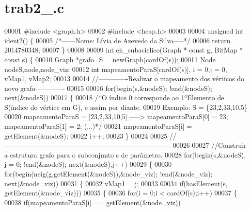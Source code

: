 \section{trab2\+\_.\+c}
\label{trab2__2014780348_8c_source}

\begin{DoxyCode}
00001 \textcolor{preprocessor}{#include <graph.h>}
00002 \textcolor{preprocessor}{#include <heap.h>}
00003 
00004 \textcolor{keywordtype}{unsigned} \textcolor{keywordtype}{int} ident2() \{
00005         \textcolor{comment}{/*------Nome: Lívia de Azevedo da Silva-----*/}
00006         \textcolor{keywordflow}{return} 2014780348;
00007 \}
00008 
00009 \textcolor{keywordtype}{int} eh_subaciclico(Graph * \textcolor{keyword}{const} g, BitMap * \textcolor{keyword}{const} s) \{
00010         Graph *grafo\_S = newGraph(cardOf(s));
00011         Node nodeS,node,node\_viz;
00012     \textcolor{keywordtype}{int} mapeamentoParaS[cardOf(s)], i = 0,j = 0, vMap1, vMap2;
00013 
00014     \textcolor{comment}{//-------------Realizar o mapeamento dos vérticos do novo grafo-------------}
00015 
00016     \textcolor{keywordflow}{for}(begin(s,&nodeS); !end(&nodeS); next(&nodeS))
00017     \{
00018         \textcolor{comment}{/*O índice 0 corresponde ao 1ºElemento de S(índice do vértice em G), e assim por diante.}
00019 \textcolor{comment}{        Exemplo: S = \{23,2,33,10,5\}}
00020 \textcolor{comment}{        mapeamentoParaS = [23,2,33,10,5] -----> mapeamentoParaS[0] = 23; mapeamentoParaS[1] = 2; (...)*/}
00021         mapeamentoParaS[i] = getElement(&nodeS);
00022         i++;
00023     \}
00024 
00025     \textcolor{comment}{//--------------------------------------------------------------------------}
00026 
00027     \textcolor{comment}{//Construir a estrutura grafo para o subconjunto s de parâmetro.}
00028         \textcolor{keywordflow}{for}(begin(s,&nodeS), j = 0; !end(&nodeS); next(&nodeS),j++)
00029         \{
00030                 \textcolor{keywordflow}{for}(begin(neig(g,getElement(&nodeS)),&node\_viz); !end(&node\_viz); 
      next(&node\_viz))
00031                 \{
00032             vMap1 = j;
00033 
00034                         \textcolor{keywordflow}{if}(hasElement(s, getElement(&node\_viz)))
00035                         \{
00036                 \textcolor{keywordflow}{for}(i = 0;i < cardOf(s);i++)
00037                 \{
00038                     \textcolor{keywordflow}{if}(mapeamentoParaS[i] == getElement(&node\_viz))

\end{DoxyCode}

